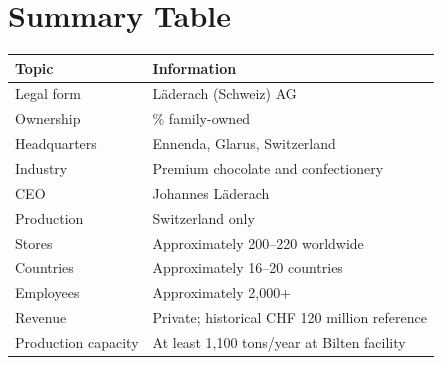 \section{Summary Table}

\begin{longtable}{>{\raggedright\arraybackslash}p{5cm} >{\raggedright\arraybackslash}p{9cm}}
\toprule
\textbf{Topic} & \textbf{Information} \\
\midrule
Legal form & Läderach (Schweiz) AG \\
Ownership & 100\% family-owned \\
Headquarters & Ennenda, Glarus, Switzerland \\
Industry & Premium chocolate and confectionery \\
CEO & Johannes Läderach \\
Production & Switzerland only \\
Stores & Approximately 200--220 worldwide \\
Countries & Approximately 16--20 countries \\
Employees & Approximately 2,000+ \\
Revenue & Private; historical CHF 120 million reference \\
Production capacity & At least 1,100 tons/year at Bilten facility \\
\bottomrule
\end{longtable}
